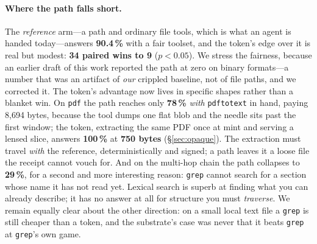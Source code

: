 \documentclass[10pt,twocolumn]{article}
\newcommand{\tok}[1]{\texttt{#1}}
\begin{document}
\paragraph{Where the path falls short.} The \emph{reference} arm---a path and
ordinary file tools, which is what an agent is handed today---answers \textbf{90.4\,\%}
with a fair toolset, and the token's edge over it is real but modest:
\textbf{34 paired wins to 9} ($p<0.05$). We stress the fairness, because an earlier
draft of this work reported the path at zero on binary formats---a number that was
an artifact of \emph{our} crippled baseline, not of file paths, and we corrected it.
The token's advantage now lives in specific shapes rather than a blanket win. On
\texttt{pdf} the path reaches only \textbf{78\,\%} \emph{with} \texttt{pdftotext} in
hand, paying 8{,}694 bytes, because the tool dumps one flat blob and the needle sits
past the first window; the token, extracting the same PDF once at mint and serving a
lensed slice, answers \textbf{100\,\%} at \textbf{750 bytes} (\S\ref{sec:opaque}).
The extraction must travel \emph{with} the reference, deterministically and signed;
a path leaves it a loose file the receipt cannot vouch for. And on the multi-hop
chain the path collapses to \textbf{29\,\%}, for a second and more interesting
reason: \tok{grep} cannot search for a section whose name it has not read yet.
Lexical search is superb at finding what you can already describe; it has no answer
at all for structure you must \emph{traverse}. We remain equally clear about the
other direction: on a small local text file a \tok{grep} is still cheaper than a
token, and the substrate's case was never that it beats \tok{grep} at \tok{grep}'s
own game.
\end{document}
